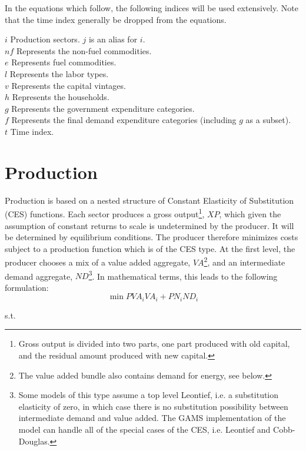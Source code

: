\documentclass{article}
\begin{document}
In the equations which follow, the following indices will be used extensively. Note that the time index generally be dropped from the equations.
{
\small

$i$	Production sectors. $j$ is an alias for $i$.\\
$nf$	Represents the non-fuel commodities.\\
$e$	Represents fuel commodities.\\
$l$	Represents the labor types.\\
$v$	Represents the capital vintages.\\
$h$	Represents the households.\\
$g$	Represents the government expenditure categories.\\
$f$	Represents the final demand expenditure categories (including $g$ as a subset).\\
$t$	Time index.\\

}

\section{Production}
Production is based on a nested structure of Constant Elasticity of Substitution (CES) functions. Each sector produces a gross output\footnote{Gross output is divided into two parts, one part produced with old capital, and the residual amount produced with new capital.}, $XP$, which given the assumption of constant returns to scale is undetermined by the producer. It will be determined by equilibrium conditions. The producer therefore minimizes costs subject to a production function which is of the CES type. At the first level, the producer chooses a mix of a value added aggregate, $VA$\footnote{The value added bundle also contains demand for energy, see below.}, and an intermediate demand aggregate, $ND$\footnote{Some models of this type assume a top level Leontief, i.e. a substitution elasticity of zero, in which case there is no substitution possibility between intermediate demand and value added. The GAMS implementation of the model can handle all of the special cases of the CES, i.e. Leontief and Cobb-Douglas.}.  In mathematical terms, this leads to the following formulation:
$$
\min PV\!A_i  V\!A_i + PN_i N\!D_i
$$
{\centering s.t. \par}
\end{document}
